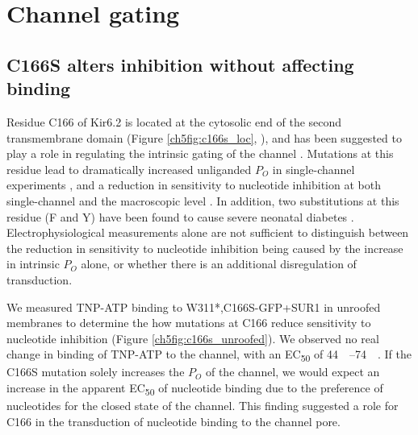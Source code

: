 \section{Channel gating}

\subsection{C166S alters inhibition without affecting binding}

Residue C166 of Kir6.2 is located at the cytosolic end of the second transmembrane domain (Figure \ref{ch5fig:c166s_loc}, \cite{lee_molecular_2017, martin_anti-diabetic_2017, li_structure_2017, puljung_cryo-electron_2018-1}), and has been suggested to play a role in regulating the intrinsic gating of the channel \cite{gloyn_kcnj11_2006, trapp_molecular_1998, ribalet_atp-sensitive_2006, yang_palmitoylation_2020, loussouarn_structure_2000, enkvetchakul_kinetic_2000}.
Mutations at this residue lead to dramatically increased unliganded $P_O$ in single-channel experiments \cite{trapp_molecular_1998, enkvetchakul_kinetic_2000, ribalet_atp-sensitive_2006}, and a reduction in sensitivity to nucleotide inhibition at both single-channel and the macroscopic level \cite{trapp_molecular_1998, enkvetchakul_kinetic_2000, ribalet_atp-sensitive_2006, li_decomposition_2013, yang_palmitoylation_2020}.
In addition, two substitutions at this residue (F and Y) have been found to cause severe neonatal diabetes \cite{gloyn_kcnj11_2006}.
Electrophysiological measurements alone are not sufficient to distinguish between the reduction in sensitivity to nucleotide inhibition being caused by the increase in intrinsic $P_O$ alone, or whether there is an additional disregulation of transduction.

We measured TNP-ATP binding to W311*,C166S-GFP+SUR1 in unroofed membranes to determine the how mutations at C166 reduce sensitivity to nucleotide inhibition (Figure \ref{ch5fig:c166s_unroofed}).
We observed no real change in binding of TNP-ATP to the channel, with an EC\textsubscript{50} of \SIrange{44}{74}{\micro\Molar}.
If the C166S mutation solely increases the $P_O$ of the channel, we would expect an increase in the apparent EC\textsubscript{50} of nucleotide binding due to the preference of nucleotides for the closed state of the channel.
This finding suggested a role for C166 in the transduction of nucleotide binding
to the channel pore.

